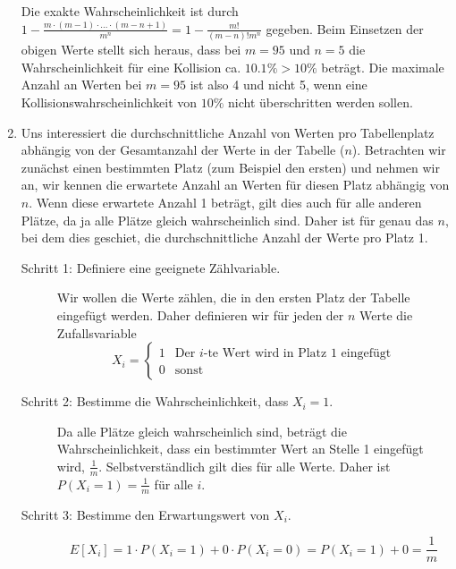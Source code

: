 \documentclass[11pt,a4paper]{article}
\begin{document}
\begin{loesung}
\begin{enumerate}
        Die exakte Wahrscheinlichkeit ist durch $1 - \frac{m \cdot (m - 1) \cdot \ldots \cdot (m - n + 1)}{m^n} = 1 - \frac{m!}{(m - n)! m^n}$ gegeben.
        Beim Einsetzen der obigen Werte stellt sich heraus, dass bei $m = 95$ und $n = 5$ die Wahrscheinlichkeit für eine Kollision ca. $10.1\% > 10\%$ beträgt.
        Die maximale Anzahl an Werten bei $m = 95$ ist also 4 und nicht 5, wenn eine Kollisionswahrscheinlichkeit von $10\%$ nicht überschritten werden sollen.
        
        \item 
        Uns interessiert die durchschnittliche Anzahl von Werten pro Tabellenplatz abhängig von der Gesamtanzahl der Werte in der Tabelle ($n$).
        Betrachten wir zunächst einen bestimmten Platz (zum Beispiel den ersten) und nehmen wir an, wir kennen die erwartete Anzahl an Werten für diesen Platz abhängig von $n$.
        Wenn diese erwartete Anzahl 1 beträgt, gilt dies auch für alle anderen Plätze, da ja alle Plätze gleich wahrscheinlich sind.
        Daher ist für genau das $n$, bei dem dies geschiet, die durchschnittliche Anzahl der Werte pro Platz 1.
        \begin{description}
            \item[Schritt 1: Definiere eine geeignete Zählvariable.]
            Wir wollen die Werte zählen, die in den ersten Platz der Tabelle eingefügt werden.
            Daher definieren wir für jeden der $n$ Werte die Zufallsvariable
            \begin{equation*}
                X_i = \begin{cases}
                    1 & \text{Der $i$-te Wert wird in Platz 1 eingefügt} \\
                    0 & \text{sonst}
                \end{cases}
            \end{equation*}
            \item[Schritt 2: Bestimme die Wahrscheinlichkeit, dass $X_i = 1$.]
            Da alle Plätze gleich wahrscheinlich sind, beträgt die Wahrscheinlichkeit, dass ein bestimmter Wert an Stelle 1 eingefügt wird, $\frac{1}{m}$.
            Selbstverständlich gilt dies für alle Werte.
            Daher ist $P(X_i = 1) = \frac{1}{m}$ für alle $i$.
            \item[Schritt 3: Bestimme den Erwartungswert von $X_i$.]
            \begin{equation*}
                E[X_i] = 1 \cdot P(X_i = 1) + 0 \cdot P(X_i = 0) = P(X_i = 1) + 0 = \frac{1}{m}
            \end{equation*}

\end{description}
\end{enumerate}
\end{loesung}
\end{document}
